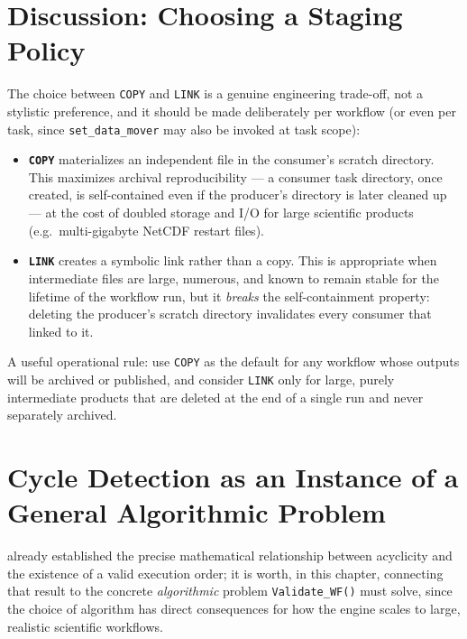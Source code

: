 \section{Discussion: Choosing a Staging Policy}

The choice between \texttt{COPY} and \texttt{LINK} is a genuine engineering
trade-off, not a stylistic preference, and it should be made deliberately per
workflow (or even per task, since \texttt{set\_data\_mover} may also be
invoked at task scope):

\begin{itemize}[leftmargin=1.4em]
  \item \textbf{\texttt{COPY}} materializes an independent file in the
    consumer's scratch directory. This maximizes archival reproducibility ---
    a consumer task directory, once created, is self-contained even if the
    producer's directory is later cleaned up --- at the cost of doubled
    storage and I/O for large scientific products (e.g.\ multi-gigabyte
    NetCDF restart files).
  \item \textbf{\texttt{LINK}} creates a symbolic link rather than a copy.
    This is appropriate when intermediate files are large, numerous, and
    known to remain stable for the lifetime of the workflow run, but it
    \emph{breaks} the self-containment property: deleting the producer's
    scratch directory invalidates every consumer that linked to it.
\end{itemize}

\begin{practicebox}
A useful operational rule: use \texttt{COPY} as the default for any
workflow whose outputs will be archived or published, and consider
\texttt{LINK} only for large, purely intermediate products that are deleted
at the end of a single run and never separately archived.
\end{practicebox}

\section{Cycle Detection as an Instance of a General Algorithmic Problem}

 already established the precise mathematical
relationship between acyclicity and the existence of a valid execution
order; it is worth, in this chapter, connecting that result to the concrete
\emph{algorithmic} problem \texttt{Validate\_WF()} must solve, since the
choice of algorithm has direct consequences for how the engine scales to
large, realistic scientific workflows.

